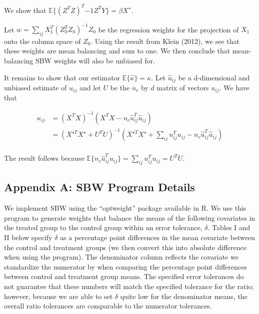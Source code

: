 \documentclass[12pt]{article}
\begin{document}
We show that $\mathbb{E}\{(Z^TZ)^T{-1}Z^TY\} = \beta X^\star$.

Let $w = \sum_{ij} X_1^T(Z_0^TZ_0)^{-1}Z_0$ be the regression weights for the projection of $X_1$ onto the column space of $Z_0$. Using the result from Klein (2012), we see that these weights are mean balancing and sum to one. We then conclude that mean-balancing SBW weights will also be unbiased for.

It remains to show that our estimator $\mathbb{E}\{\hat{\kappa}\} = \kappa$. Let $\hat{u}_{ij}$ be a d-dimensional and unbiased estimate of $u_{ij}$ and let $U$ be the $n_c$ by $d$ matrix of vectors $u_{ij}$. We have that 

\begin{align*}
    \hat{\kappa}_{ij} &= (X^TX)^{-1}(X^TX - n_c\hat{u}_{ij}^T\hat{u}_{ij}) \\
    &= (X^{\star T}X^\star + U^TU)^{-1}(X^{\star T}X^\star + \sum_{ij} u_{ij}^Tu_{ij} - n_c\hat{u}_{ij}^T\hat{u}_{ij}) \\
\end{align*}

The result follows because $\mathbb{E}\{n_c\hat{u}_{ij}^Tu_{ij}\} = \sum_{ij} u_{ij}^Tu_{ij} = U^TU$.


\subsection{Appendix A: SBW Program Details}

We implement SBW using the ``optweight'' package available in R. We use this program to generate weights that balance the means of the following covariates in the treated group to the control group within an error tolerance, $\delta$. Tables I and II below specify $\delta$ as a percentage point differences in the mean covariate between the control and treatment groups (we then convert this into absolute difference when using the program). The denominator column reflects the covariate we standardize the numerator by when comparing the percentage point differences between control and treatment group means. The specified error tolerances do not guarantee that these numbers will match the specified tolerance for the ratio; however, because we are able to set $\delta$ quite low for the denominator means, the overall ratio tolerances are comparable to the numerator tolerances.
\end{document}

